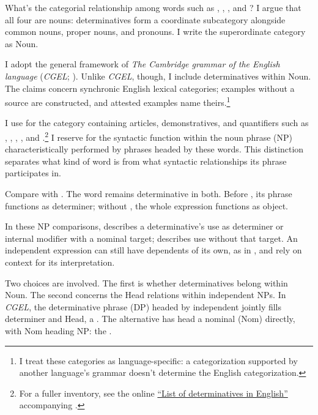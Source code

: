 \documentclass[12pt]{article}
\begin{document}
What's the categorial relationship among words such as , , , and ? I argue that all four are nouns: determinatives form a coordinate subcategory alongside common nouns, proper nouns, and pronouns. I write the superordinate category as Noun.

I adopt the general framework of \textit{The Cambridge grammar of the English language} (\textit{CGEL}; \citealp{huddleston2002}). Unlike \textit{CGEL}, though, I include determinatives within Noun. The claims concern synchronic English lexical categories; examples without a source are constructed, and attested examples name theirs.\footnote{I treat these categories as language-specific: a categorization supported by another language's grammar doesn't determine the English categorization.}

I use  for the category containing articles, demonstratives, and quantifiers such as , , , , and .\footnote{For a fuller inventory, see the online \href{https://www.cambridge.org/highereducation/api/resources/2AC8DF5CA558F8A6FCDFACD0EAF8EA08}{\enquote{List of determinatives in English}} accompanying \textcite{Huddleston2021}.} I reserve  for the syntactic function within the noun phrase (NP) characteristically performed by phrases headed by these words. This distinction separates what kind of word  is from what syntactic relationships its phrase participates in.

Compare  with . The word  remains determinative in both. Before , its phrase functions as determiner; without , the whole expression functions as object.

In these NP comparisons,  describes a determinative's use as determiner or internal modifier with a nominal target;  describes use without that target. An independent expression can still have dependents of its own, as in , and rely on context for its interpretation.

Two choices are involved. The first is whether determinatives belong within Noun. The second concerns the Head relations within independent NPs. In \textit{CGEL}, the determinative phrase (DP) headed by independent  jointly fills determiner and Head, a  \citep[410--412]{huddleston2002}. The alternative has  head a nominal (Nom) directly, with Nom heading NP: the .
\end{document}
